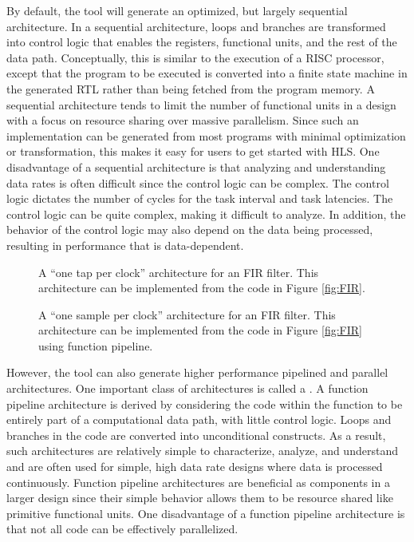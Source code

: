 By default, the \VHLS tool will generate an optimized, but largely sequential architecture.   In a sequential architecture, loops and branches are transformed into control logic that enables the registers, functional units, and the rest of the data path.  Conceptually, this is similar to the execution of a RISC processor, except that the program to be executed is converted into a finite state machine in the generated RTL rather than being fetched from the program memory.   A sequential architecture tends to limit the number of functional units in a design with a focus on resource sharing over massive parallelism.  Since such an implementation can be generated from most programs with minimal optimization or transformation, this makes it easy for users to get started with HLS.  One disadvantage of a sequential architecture is that analyzing and understanding data rates is often difficult since the control logic can be complex.  The control logic dictates the number of cycles for the task interval and task latencies. The control logic can be quite complex, making it difficult to analyze. In addition, the behavior of the control logic may also depend on the data being processed, resulting in performance that is data-dependent.

\begin{figure}
\centering
\mbox{}\mbox{}
\caption{A ``one tap per clock'' architecture for an FIR filter.  This architecture can be implemented from the code in Figure \ref{fig:FIR}.}
\label{fig:FIR_sequential}
\end{figure}

\begin{figure}
\centering
\mbox{}\mbox{}
\caption{A ``one sample per clock'' architecture for an FIR filter.  This architecture can be implemented from the code in Figure \ref{fig:FIR} using function pipeline.}\label{fig:FIR_function_pipeline}
\end{figure}

However, the \VHLS tool can also generate higher performance pipelined and parallel architectures.  One important class of architectures is called a .  A function pipeline architecture is derived by considering the code within the function to be entirely part of a computational data path, with little control logic.  Loops and branches in the code are converted into unconditional constructs.  As a result, such architectures are relatively simple to characterize, analyze, and understand and are often used for simple, high data rate designs where data is processed continuously.  Function pipeline architectures are beneficial as components in a larger design since their simple behavior allows them to be resource shared like primitive functional units.  One disadvantage of a function pipeline architecture is that not all code can be effectively parallelized.

